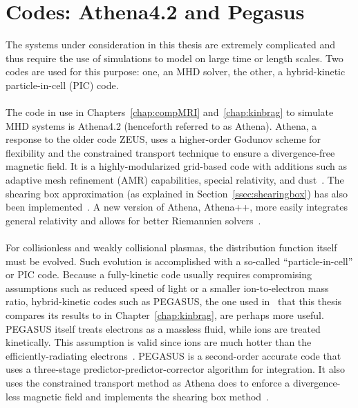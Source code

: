 
\section{Codes: Athena4.2 and Pegasus} \label{sec:codes}
The systems under consideration in this thesis are extremely complicated and thus require the use of simulations to model on large time or length scales. Two codes are used for this purpose: one, an MHD solver, the other, a hybrid-kinetic particle-in-cell (PIC) code.\\
\\
The code in use in Chapters~\ref{chap:compMRI} and~\ref{chap:kinbrag} to simulate MHD systems is Athena4.2 (henceforth referred to as Athena). Athena, a response to the older code ZEUS, uses a higher-order Godunov scheme for flexibility and the constrained transport technique to ensure a divergence-free magnetic field. It is a highly-modularized grid-based code with additions such as adaptive mesh refinement (AMR) capabilities, special relativity, and dust~\cite{Stone2008,Stone2009}. The shearing box approximation (as explained in Section~\ref{ssec:shearingbox}) has also been implemented~\cite{Stone2010}. A new version of Athena, Athena++, more easily integrates general relativity and allows for better Riemannien solvers~\cite{White2016Thesis,White2016}.\\
\\
For collisionless and weakly collisional plasmas, the distribution function itself must be evolved. Such evolution is accomplished with a so-called ``particle-in-cell'' or PIC code. Because a fully-kinetic code usually requires compromising assumptions such as reduced speed of light or a smaller ion-to-electron mass ratio, hybrid-kinetic codes such as PEGASUS, the one used in~\cite{Kunz2016} that this thesis compares its results to in Chapter~\ref{chap:kinbrag}, are perhaps more useful. PEGASUS itself treats electrons as a massless fluid, while ions are treated kinetically. This assumption is valid since ions are much hotter than the efficiently-radiating electrons~\cite{Das2013}. PEGASUS is a second-order accurate code that uses a three-stage predictor-predictor-corrector algorithm for integration. It also uses the constrained transport method as Athena does to enforce a divergence-less magnetic field and implements the shearing box method~\cite{Kunz2014}. 


